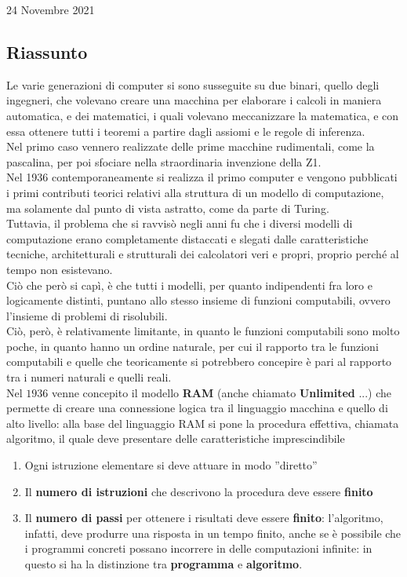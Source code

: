 \documentclass[a4paper]{extarticle}
\newcommand{\quotes}[1]{''#1''}
\begin{document}
\newpage
\begin{center}
    24 Novembre 2021
\end{center}
\subsection{Riassunto}
Le varie generazioni di computer si sono susseguite su due binari, quello degli ingegneri, che volevano creare una macchina per elaborare i calcoli in maniera automatica, e dei matematici, i quali volevano meccanizzare la matematica, e con essa ottenere tutti i teoremi a partire dagli assiomi e le regole di inferenza.\\
Nel primo caso vennero realizzate delle prime macchine rudimentali, come la pascalina, per poi sfociare nella straordinaria invenzione della Z1.\\
Nel 1936 contemporaneamente si realizza il primo computer e vengono pubblicati i primi contributi teorici relativi alla struttura di un modello di computazione, ma solamente dal punto di vista astratto, come da parte di Turing.\\
Tuttavia, il problema che si ravvisò negli anni fu che i diversi modelli di computazione erano completamente distaccati e slegati dalle caratteristiche tecniche, architetturali e strutturali dei calcolatori veri e propri, proprio perché al tempo non esistevano.\\
Ciò che però si capì, è che tutti i modelli, per quanto indipendenti fra loro e logicamente distinti, puntano allo stesso insieme di funzioni computabili, ovvero l'insieme di problemi di risolubili.\\
Ciò, però, è relativamente limitante, in quanto le funzioni computabili sono molto poche, in quanto hanno un ordine naturale, per cui il rapporto tra le funzioni computabili e quelle che teoricamente si potrebbero concepire è pari al rapporto tra i numeri naturali e quelli reali.\\
Nel \(1936\) venne concepito il modello \textbf{RAM} (anche chiamato \textbf{Unlimited} ...) che permette di creare una connessione logica tra il linguaggio macchina e quello di alto livello: alla base del linguaggio RAM si pone la procedura effettiva, chiamata algoritmo, il quale deve presentare delle caratteristiche imprescindibile
\begin{enumerate}
    \item Ogni istruzione elementare si deve attuare in modo \quotes{diretto}
    \item Il \textbf{numero di istruzioni} che descrivono la procedura deve essere \textbf{finito}
    \item Il \textbf{numero di passi} per ottenere i risultati deve essere \textbf{finito}: l'algoritmo, infatti, deve produrre una risposta in un tempo finito, anche se è possibile che i programmi concreti possano incorrere in delle computazioni infinite: in questo si ha la distinzione tra \textbf{programma} e \textbf{algoritmo}.
\end{enumerate}
\end{document}
